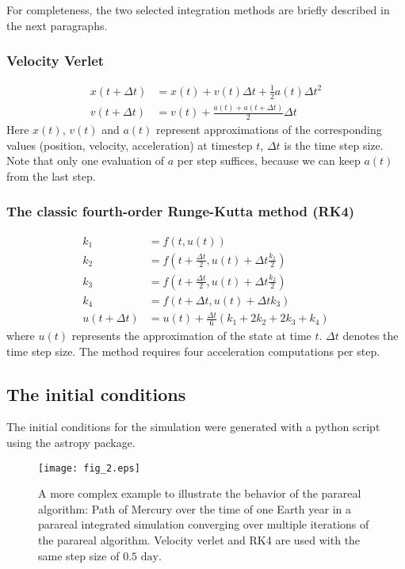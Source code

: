 \documentclass[conference]{IEEEtran}
\begin{document}
For completeness, the two selected integration methods are briefly described in the next paragraphs.
\subsubsection{Velocity Verlet}

\begin{align*}
x(t+\Delta t) &= x(t) + v(t)\Delta t + \frac{1}{2}a(t)\Delta t^2 \\
v(t+\Delta t) &= v(t) + \frac{a(t) + a(t+\Delta t)}{2}\Delta t
\end{align*}
Here $x(t)$, $v(t)$ and $a(t)$ represent approximations of the corresponding values (position, velocity, acceleration) at timestep $t$, $\Delta t$ is the time step size. Note that only one evaluation of $a$ per step suffices, because we can keep $a(t)$ from the last step. \cite{forverlet}

\subsubsection{The classic fourth-order Runge-Kutta method (RK4)}
\begin{align*}
k_1 &= f(t, u(t)) \\
k_2 &= f(t + \frac{\Delta t}{2}, u(t) + \Delta t\frac{k_1}{2}) \\
k_3 &= f(t + \frac{\Delta t}{2}, u(t) + \Delta t\frac{k_2}{2}) \\
k_4 &= f(t + \Delta t, u(t) + \Delta t k_3) \\
u(t+\Delta t) &= u(t) + \frac{\Delta t}{6}\left(k_1 + 2k_2 + 2k_3 + k_4\right)
\end{align*}
where $u(t)$ represents the approximation of the state at time $t$. $\Delta t$ denotes the time step size. The method requires four acceleration computations per step. \cite{forrk4}

\subsection{The initial conditions}
The initial conditions for the simulation were generated with a python script using the astropy package. \cite{astropy}

\begin{figure}[htbp]
\centerline{\texttt{[image: fig\_2.eps]}}
\caption{A more complex example to illustrate the behavior of the parareal algorithm: Path of Mercury over the time of one Earth year in a parareal integrated simulation converging over multiple iterations of the parareal algorithm. Velocity verlet and RK4 are used with the same step size of $0.5\text{ day}$.}
\label{mercury}
\end{figure}
\end{document}
